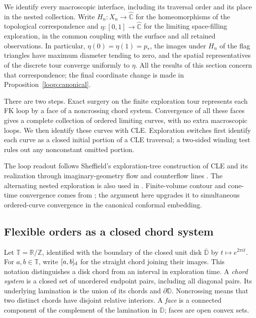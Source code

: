 \documentclass[11pt]{article}
\numberwithin{equation}{section}
\theoremstyle{definition}
\theoremstyle{remark}
\newcommand{\1}{\mathbf 1}
\begin{document}
We identify every macroscopic interface, including its traversal order
and its place in the nested collection.  Write $H_n:X_n\to\widehat{\mathbb C}$
for the homeomorphisms of the
topological correspondence and $\eta:[0,1]\to\widehat{\mathbb C}$ for the limiting
space-filling exploration, in the common coupling with the surface and
all retained observations.  In particular, $\eta(0)=\eta(1)=p_*$,
the images under $H_n$ of the flag triangles have maximum diameter tending
to zero, and the spatial representatives of the discrete tour converge
uniformly to $\eta$.  All the results of this section concern that
correspondence; the final coordinate change is made in
Proposition~\ref{loop:canonical}.

There are two steps.  Exact surgery on the finite exploration tour
represents each FK loop by a face of a noncrossing chord system.
Convergence of all these faces gives a complete collection of ordered
limiting curves, with no extra macroscopic loops.  We then identify
these curves with CLE.  Exploration switches first identify each curve
as a closed initial portion of a CLE traversal; a two-sided winding
test rules out any nonconstant omitted portion.

The loop readout follows Sheffield's exploration-tree construction of
CLE \cite{SheffieldExplorationTrees} and its realization through
imaginary-geometry flow and counterflow lines \cite{MillerSheffieldIGIV}.
The alternating nested exploration is also used in
\cite[Section~2.1.6]{AruHoldenPowellSunCritical}. Finite-volume contour and
cone-time convergence comes from \citet{GwynneSunFKIII}; the argument
here upgrades it to simultaneous ordered-curve convergence in the
canonical conformal embedding.

\subsection{Flexible orders as a closed chord system}

Let $\mathbb T=\mathbb R/\mathbb Z$, identified with the boundary of the closed unit disk
$\overline{\mathbb D}$ by $t\mapsto e^{2\pi it}$.  For $a,b\in\mathbb T$,
write $[a,b]_{\rm d}$ for the straight chord joining their images.  This
notation distinguishes a disk chord from an interval in exploration time.
A \emph{chord system} is a closed set of unordered endpoint pairs, including
all diagonal pairs.  Its underlying lamination is the union of its chords
and $\partial\mathbb D$.  Noncrossing means that two distinct chords have
disjoint relative interiors.  A \emph{face} is a connected component of the
complement of the lamination in $\mathbb D$; faces are open convex sets.
\end{document}
